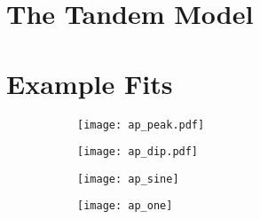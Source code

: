 \appendix
\section{The Tandem Model}\label{sec:apdx_A}




\newpage

\section{Example Fits}

\begin{figure}[H]
\centering
\begin{subfigure}{.5\textwidth}
    \centering
    \texttt{[image: ap\_peak.pdf]}
    \caption{}
    \label{}
\end{subfigure}%
\begin{subfigure}{.5\textwidth}
    \centering
    \texttt{[image: ap\_dip.pdf]}
    \caption{}
    \label{}
\end{subfigure}
\caption{}
\label{}
\end{figure}


\begin{figure}[H]
\centering
\begin{subfigure}{.5\textwidth}
    \centering
    \texttt{[image: ap\_sine]}
    \caption{}
    \label{}
\end{subfigure}%
\begin{subfigure}{.5\textwidth}
    \centering
    \texttt{[image: ap\_one]}
    \caption{}
    \label{}
\end{subfigure}
\caption{}
\label{}
\end{figure}